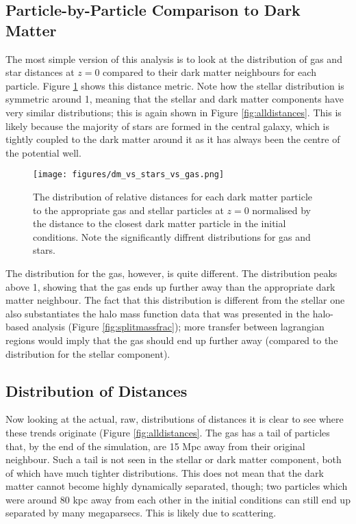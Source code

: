 \subsection{Particle-by-Particle Comparison to Dark Matter}

The most simple version of this analysis is to look at the distribution of gas and star distances at $z=0$ compared to their dark matter neighbours for each particle. Figure \ref{fig:dmvsstarvsgas} shows this distance metric. Note how the stellar distribution is symmetric around 1, meaning that the stellar and dark matter components have very similar distributions; this is again shown in Figure \ref{fig:alldistances}. This is likely because the majority of stars are formed in the central galaxy, which is tightly coupled to the dark matter around it as it has always been the centre of the potential well.

\begin{figure}
    \centering
    \texttt{[image: figures/dm\_vs\_stars\_vs\_gas.png]}
    \caption{The distribution of relative distances for each dark matter particle to the appropriate gas and stellar particles at $z=0$ normalised by the distance to the closest dark matter particle in the initial conditions. Note the significantly diffrent distributions for gas and stars.}
    \label{fig:dmvsstarvsgas}
\end{figure}

The distribution for the gas, however, is quite different. The distribution peaks above 1, showing that the gas ends up further away than the appropriate dark matter neighbour. The fact that this distribution is different from the stellar one also substantiates the halo mass function data that was presented in the halo-based analysis (Figure \ref{fig:splitmassfrac}); more transfer between lagrangian regions would imply that the gas should end up further away (compared to the distribution for the stellar component).

\subsection{Distribution of Distances}

Now looking at the actual, raw, distributions of distances it is clear to see where these trends originate (Figure \ref{fig:alldistances}. The gas has a tail of particles that, by the end of the simulation, are 15 Mpc away from their original neighbour. Such a tail is not seen in the stellar or dark matter component, both of which have much tighter distributions. This does not mean that the dark matter cannot become highly dynamically separated, though; two particles which were around 80 kpc away from each other in the initial conditions can still end up separated by many megaparsecs. This is likely due to scattering.

